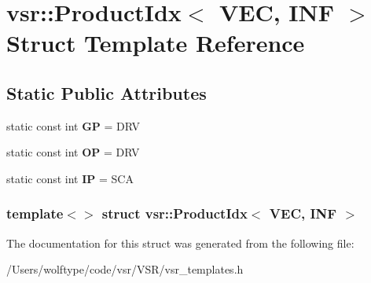\hypertarget{structvsr_1_1_product_idx_3_01_v_e_c_00_01_i_n_f_01_4}{\section{vsr\-:\-:Product\-Idx$<$ V\-E\-C, I\-N\-F $>$ Struct Template Reference}
\label{structvsr_1_1_product_idx_3_01_v_e_c_00_01_i_n_f_01_4}
}
\subsection*{Static Public Attributes}
\begin{DoxyCompactItemize}
\item 
\hypertarget{structvsr_1_1_product_idx_3_01_v_e_c_00_01_i_n_f_01_4_ad3e77e474551527c17a851b7aaadccc2}{static const int {\bfseries G\-P} = D\-R\-V}\label{structvsr_1_1_product_idx_3_01_v_e_c_00_01_i_n_f_01_4_ad3e77e474551527c17a851b7aaadccc2}

\item 
\hypertarget{structvsr_1_1_product_idx_3_01_v_e_c_00_01_i_n_f_01_4_af76388ae97b6b68b69def1d9b81c1d3c}{static const int {\bfseries O\-P} = D\-R\-V}\label{structvsr_1_1_product_idx_3_01_v_e_c_00_01_i_n_f_01_4_af76388ae97b6b68b69def1d9b81c1d3c}

\item 
\hypertarget{structvsr_1_1_product_idx_3_01_v_e_c_00_01_i_n_f_01_4_a26a3be359c383b7a8a458497a9a0330e}{static const int {\bfseries I\-P} = S\-C\-A}\label{structvsr_1_1_product_idx_3_01_v_e_c_00_01_i_n_f_01_4_a26a3be359c383b7a8a458497a9a0330e}

\end{DoxyCompactItemize}
\subsubsection*{template$<$$>$ struct vsr\-::\-Product\-Idx$<$ V\-E\-C, I\-N\-F $>$}



The documentation for this struct was generated from the following file\-:\begin{DoxyCompactItemize}
\item 
/\-Users/wolftype/code/vsr/\-V\-S\-R/vsr\-\_\-templates.\-h\end{DoxyCompactItemize}

